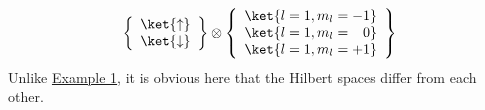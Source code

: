 \begin{align}
						\left\{

\begin{array}
{c} \ket{\uparrow} \\ \ket{\downarrow} \end{array}
 \right\} \otimes \left\{

\begin{array}
{c} \ket{l=1,m_l=-1} \\ \ket{l=1,m_l=\enspace \; 0} \\ \ket{l=1,m_l=+1}  \end{array}
 \right\}
					
\end{align}
										Unlike \hyperref[sec:examplespin]{Example 1}, it is obvious here that the Hilbert spaces differ from each other.